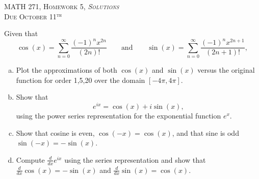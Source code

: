 \documentclass[12pt]{article} %
\begin{document}
\begin{center}
   \textsc{\large MATH 271, Homework 5, \emph{Solutions}}\\
   \textsc{Due October 11$^\textrm{th}$}
\end{center}
\vspace{.5cm}

\begin{problem}
	Given that
	\[
	\cos(x) = \sum_{n=0}^\infty \frac{(-1)^n x^{2n}}{(2n)!} \qquad \textrm{and} \qquad \sin(x) = \sum_{n=0}^\infty \frac{(-1)^n x^{2n+1}}{(2n+1)!},
	\]
	\begin{enumerate}[(a)]
		\item Plot the approximations of both $\cos(x)$ and $\sin(x)$ versus the original function for order 1,5,20 over the domain $[-4\pi,4\pi]$.
		\item Show that
		\[
		e^{ix} = \cos(x) + i \sin(x),
		\]
		using the power series representation for the exponential function $e^x$.
		\item Show that cosine is even, $\cos(-x)=\cos(x)$, and that sine is odd $\sin(-x)=-\sin(x)$.
		\item Compute $\frac{d}{dx} e^{ix}$ using the series representation and show that $\frac{d}{dx}\cos(x)=-\sin(x)$ and $\frac{d}{dx}\sin(x)=\cos(x)$. 
	\end{enumerate}	
\end{problem}
\end{document}
